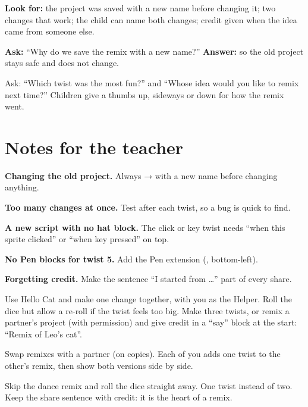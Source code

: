\begin{formativecheck}
\textbf{Look for:} the project was saved with a new name before changing it; two changes that work; the child can name both changes; credit given when the idea came from someone else.

\textbf{Ask:} \enquote{Why do we save the remix with a new name?}
\textbf{Answer:} so the old project stays safe and does not change.
\end{formativecheck}

\begin{reflection}
Ask: \enquote{Which twist was the most fun?} and \enquote{Whose idea would you like to remix next time?} Children give a thumbs up, sideways or down for how the remix went.
\end{reflection}

\section{Notes for the teacher}
\begin{commonmistakes}
  \item \textbf{Changing the old project.} Always  →  with a new name before changing anything.
  \item \textbf{Too many changes at once.} Test after each twist, so a bug is quick to find.
  \item \textbf{A new script with no hat block.} The click or key twist needs \enquote{when this sprite clicked} or \enquote{when key pressed} on top.
  \item \textbf{No Pen blocks for twist 5.} Add the Pen extension (, bottom-left).
  \item \textbf{Forgetting credit.} Make the sentence \enquote{I started from \ldots} part of every share.
\end{commonmistakes}

\begin{differentiation}
\supportpath Use Hello Cat and make one change together, with you as the Helper. Roll the dice but allow a re-roll if the twist feels too big.
\extensionpath Make three twists, or remix a partner's project (with permission) and give credit in a \enquote{say} block at the start: \enquote{Remix of Leo's cat}.
\end{differentiation}

\begin{stretchchallenge}
Swap remixes with a partner (on copies). Each of you adds one twist to the other's remix, then show both versions side by side.
\end{stretchchallenge}

\begin{teachernote}
Skip the dance remix and roll the dice straight away. One twist instead of two. Keep the share sentence with credit: it is the heart of a remix.
\end{teachernote}

